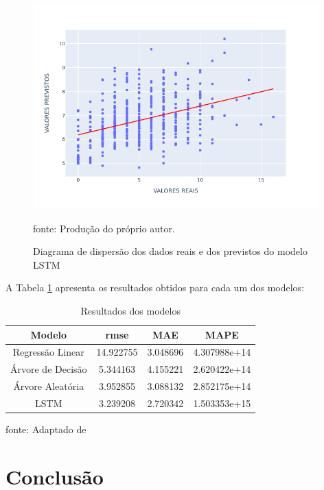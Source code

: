 \documentclass[
  12pt,		%
  a4paper,	%
  openright,%
  oneside,	%
  chapter=TITLE,		%
  section=TITLE,		%
  english,	%
  french,	%
  spanish,	%
  brazil	%
]{abntex2}
\begin{document}
    \begin{figure}[ht]
        \centering
        \caption{Diagrama de dispersão dos dados reais e dos previstos do modelo LSTM}
        \includegraphics[width=11cm]{../reports/figures/lstm_reg.png}
        \label{scatter_lstm_reg}
        \par
        {\small fonte: Produção do próprio autor.}
    \end{figure}

    A Tabela \ref*{tt} apresenta os resultados obtidos para cada um dos modelos:

    \begin{table}[ht]
        \centering
        \caption{Resultados dos modelos}
        \label{tt}
        \begin{tabular}{cccc}
            \hline
            \multicolumn{1}{|c|}{Modelo} & \multicolumn{1}{c|}{rmse} & \multicolumn{1}{c|}{MAE} & \multicolumn{1}{c|}{MAPE}\\
            \hline
            Regressão Linear & 14.922755 & 3.048696 & 4.307988e+14\\
            Árvore de Decisão & 5.344163 & 4.155221 & 2.620422e+14\\
            Árvore Aleatória & 3.952855 & 3.088132 & 2.852175e+14\\
            LSTM & 3.239208 & 2.720342 & 1.503353e+15\\
            \hline
        \end{tabular}
        \par
        {\small fonte: Adaptado de \cite[]{ibge}}
    \end{table}

    \chapter{Conclusão}
\end{document}

